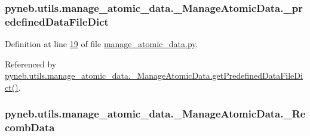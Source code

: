 \hypertarget{classpyneb_1_1utils_1_1manage__atomic__data_1_1___manage_atomic_data_ad9b54bc077170e477f23059e2256b30f}{
\subsubsection[{\-\_\-predefined\-Data\-File\-Dict}]{\setlength{\rightskip}{0pt plus 5cm}pyneb.\-utils.\-manage\-\_\-atomic\-\_\-data.\-\_\-\-Manage\-Atomic\-Data.\-\_\-predefined\-Data\-File\-Dict\hspace{0.3cm}{\ttfamily [private]}}}\label{classpyneb_1_1utils_1_1manage__atomic__data_1_1___manage_atomic_data_ad9b54bc077170e477f23059e2256b30f}


Definition at line \hyperlink{manage__atomic__data_8py_source_l00019}{19} of file \hyperlink{manage__atomic__data_8py_source}{manage\-\_\-atomic\-\_\-data.\-py}.



Referenced by \hyperlink{manage__atomic__data_8py_source_l00034}{pyneb.\-utils.\-manage\-\_\-atomic\-\_\-data.\-\_\-\-Manage\-Atomic\-Data.\-get\-Predefined\-Data\-File\-Dict()}.

\hypertarget{classpyneb_1_1utils_1_1manage__atomic__data_1_1___manage_atomic_data_a01eaf095b647e87d3dbf9094104f680c}{
\subsubsection[{\-\_\-\-Recomb\-Data}]{\setlength{\rightskip}{0pt plus 5cm}pyneb.\-utils.\-manage\-\_\-atomic\-\_\-data.\-\_\-\-Manage\-Atomic\-Data.\-\_\-\-Recomb\-Data\hspace{0.3cm}{\ttfamily [private]}}}\label{classpyneb_1_1utils_1_1manage__atomic__data_1_1___manage_atomic_data_a01eaf095b647e87d3dbf9094104f680c}


